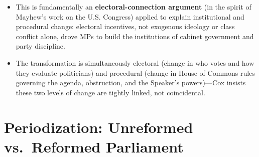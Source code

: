 \documentclass[12pt]{article}
\begin{document}
\begin{itemize}[leftmargin=*, itemsep=4pt]
    \item This is fundamentally an \textbf{electoral-connection argument} (in the spirit of Mayhew's work on the U.S. Congress) applied to explain institutional and procedural change: electoral incentives, not exogenous ideology or class conflict alone, drove MPs to build the institutions of cabinet government and party discipline.
    \item The transformation is simultaneously electoral (change in who votes and how they evaluate politicians) and procedural (change in House of Commons rules governing the agenda, obstruction, and the Speaker's powers)---Cox insists these two levels of change are tightly linked, not coincidental.
\end{itemize}

\section{Periodization: Unreformed vs.\ Reformed Parliament}
\end{document}
